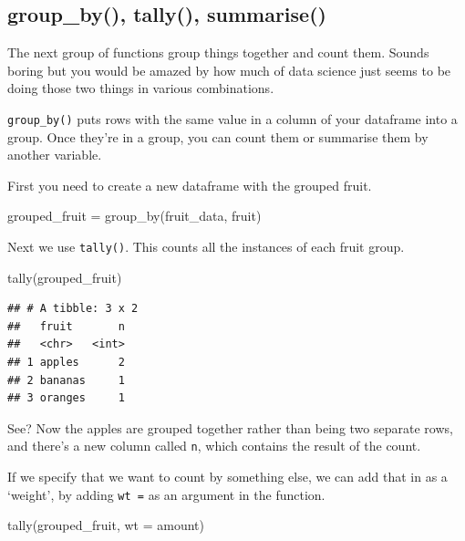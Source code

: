 \documentclass[
]{book}
\newenvironment{Shaded}{\begin{snugshade}}{\end{snugshade}}
\newcommand{\AttributeTok}[1]{\textcolor[rgb]{0.77,0.63,0.00}{#1}}
\newcommand{\FunctionTok}[1]{\textcolor[rgb]{0.00,0.00,0.00}{#1}}
\newcommand{\NormalTok}[1]{#1}
\newcommand{\OtherTok}[1]{\textcolor[rgb]{0.56,0.35,0.01}{#1}}
\begin{document}
\hypertarget{group_by-tally-summarise}{%
\subsection{group\_by(), tally(), summarise()}\label{group_by-tally-summarise}}

The next group of functions group things together and count them. Sounds boring but you would be amazed by how much of data science just seems to be doing those two things in various combinations.

\texttt{group\_by()} puts rows with the same value in a column of your dataframe into a group. Once they're in a group, you can count them or summarise them by another variable.

First you need to create a new dataframe with the grouped fruit.

\begin{Shaded}
\begin{Highlighting}[]
\NormalTok{grouped\_fruit }\OtherTok{=} \FunctionTok{group\_by}\NormalTok{(fruit\_data, fruit)}
\end{Highlighting}
\end{Shaded}

Next we use \texttt{tally()}. This counts all the instances of each fruit group.

\begin{Shaded}
\begin{Highlighting}[]
\FunctionTok{tally}\NormalTok{(grouped\_fruit)}
\end{Highlighting}
\end{Shaded}

\begin{verbatim}
## # A tibble: 3 x 2
##   fruit       n
##   <chr>   <int>
## 1 apples      2
## 2 bananas     1
## 3 oranges     1
\end{verbatim}

See? Now the apples are grouped together rather than being two separate rows, and there's a new column called \texttt{n}, which contains the result of the count.

If we specify that we want to count by something else, we can add that in as a `weight', by adding \texttt{wt\ =} as an argument in the function.

\begin{Shaded}
\begin{Highlighting}[]
\FunctionTok{tally}\NormalTok{(grouped\_fruit, }\AttributeTok{wt =}\NormalTok{ amount)}
\end{Highlighting}
\end{Shaded}
\end{document}
